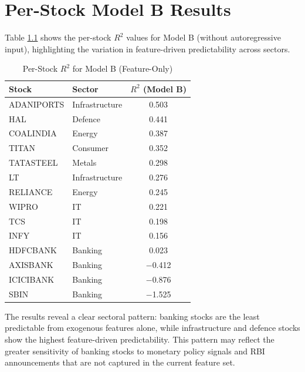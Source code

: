 \chapter{Per-Stock Model B Results}
\label{AppendixB}

Table \ref{tab:perstockB} shows the per-stock $R^2$ values for Model B (without autoregressive input), highlighting the variation in feature-driven predictability across sectors.

\begin{table}[h!]
\caption{Per-Stock $R^2$ for Model B (Feature-Only)}
\label{tab:perstockB}
\centering
\begin{tabular}{llc}
\hline
\textbf{Stock} & \textbf{Sector} & \textbf{$R^2$ (Model B)} \\
\hline
ADANIPORTS & Infrastructure & 0.503 \\
HAL & Defence & 0.441 \\
COALINDIA & Energy & 0.387 \\
TITAN & Consumer & 0.352 \\
TATASTEEL & Metals & 0.298 \\
LT & Infrastructure & 0.276 \\
RELIANCE & Energy & 0.245 \\
WIPRO & IT & 0.221 \\
TCS & IT & 0.198 \\
INFY & IT & 0.156 \\
HDFCBANK & Banking & 0.023 \\
AXISBANK & Banking & $-$0.412 \\
ICICIBANK & Banking & $-$0.876 \\
SBIN & Banking & $-$1.525 \\
\hline
\end{tabular}
\end{table}

The results reveal a clear sectoral pattern: banking stocks are the least predictable from exogenous features alone, while infrastructure and defence stocks show the highest feature-driven predictability. This pattern may reflect the greater sensitivity of banking stocks to monetary policy signals and RBI announcements that are not captured in the current feature set.
